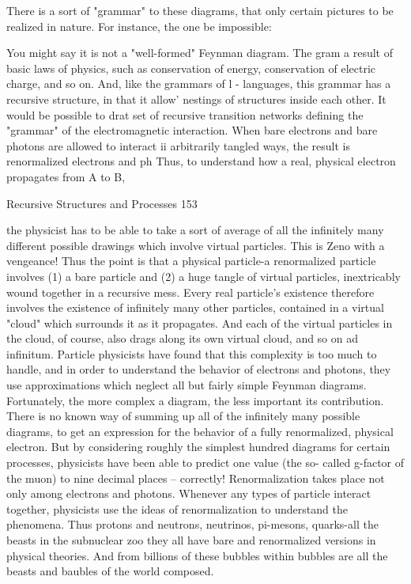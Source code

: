         There is a sort of "grammar" to these diagrams, that only certain pictures to be
realized in nature. For instance, the one be impossible:




You might say it is not a "well-formed" Feynman diagram. The gram a result of basic
laws of physics, such as conservation of energy, conservation of electric charge, and so
on. And, like the grammars of l - languages, this grammar has a recursive structure, in
that it allow' nestings of structures inside each other. It would be possible to drat set of
recursive transition networks defining the "grammar" of the electromagnetic interaction.
         When bare electrons and bare photons are allowed to interact ii arbitrarily tangled
ways, the result is renormalized electrons and ph Thus, to understand how a real, physical
electron propagates from A to B,




Recursive Structures and Processes                                                      153

the physicist has to be able to take a sort of average of all the infinitely many different
possible drawings which involve virtual particles. This is Zeno with a vengeance!
        Thus the point is that a physical particle-a renormalized particle involves (1) a
bare particle and (2) a huge tangle of virtual particles, inextricably wound together in a
recursive mess. Every real particle's existence therefore involves the existence of
infinitely many other particles, contained in a virtual "cloud" which surrounds it as it
propagates. And each of the virtual particles in the cloud, of course, also drags along its
own virtual cloud, and so on ad infinitum.
        Particle physicists have found that this complexity is too much to handle, and in
order to understand the behavior of electrons and photons, they use approximations
which neglect all but fairly simple Feynman diagrams. Fortunately, the more complex a
diagram, the less important its contribution. There is no known way of summing up all of
the infinitely many possible diagrams, to get an expression for the behavior of a fully
renormalized, physical electron. But by considering roughly the simplest hundred
diagrams for certain processes, physicists have been able to predict one value (the so-
called g-factor of the muon) to nine decimal places -- correctly!
        Renormalization takes place not only among electrons and photons. Whenever
any types of particle interact together, physicists use the ideas of renormalization to
understand the phenomena. Thus protons and neutrons, neutrinos, pi-mesons, quarks-all
the beasts in the subnuclear zoo they all have bare and renormalized versions in physical
theories. And from billions of these bubbles within bubbles are all the beasts and baubles
of the world composed.


